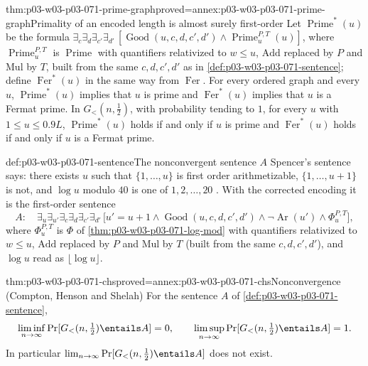 \begin{hbcorollary}{thm:p03-w03-p03-071-prime-graph}{proved=annex:p03-w03-p03-071-prime-graph}{Primality of an encoded length is almost surely first-order}
Let \(\operatorname{Prime}^{\ast}(u)\) be the formula
\(\exists_c\exists_d\exists_{c'}\exists_{d'}\,[\operatorname{Good}(u,c,d,c',d')
\wedge\operatorname{Prime}^{P,T}_u(u)]\), where
\(\operatorname{Prime}^{P,T}_u\) is \(\operatorname{Prime}\) with quantifiers
relativized to \(w\leq u\), \(\mathrm{Add}\) replaced by \(P\) and
\(\mathrm{Mul}\) by \(T\), built from the same \(c,d,c',d'\) as in
\cref{def:p03-w03-p03-071-sentence}; define \(\operatorname{Fer}^{\ast}(u)\)
in the same way from \(\operatorname{Fer}\).  For every ordered graph and
every \(u\), \(\operatorname{Prime}^{\ast}(u)\) implies that \(u\) is prime
and \(\operatorname{Fer}^{\ast}(u)\) implies that \(u\) is a Fermat prime.
In \(G_<(n,\frac12)\), with probability tending to \(1\), for every \(u\)
with \(1\leq u\leq0.9L\), \(\operatorname{Prime}^{\ast}(u)\) holds if and only
if \(u\) is prime and \(\operatorname{Fer}^{\ast}(u)\) holds if and only if
\(u\) is a Fermat prime.
\end{hbcorollary}

\begin{hbdefinition}{def:p03-w03-p03-071-sentence}{The nonconvergent sentence \(A\)}
Spencer's sentence says: there exists \(u\) such that
\(\{1,\ldots,u\}\) is first order arithmetizable, \(\{1,\ldots,u+1\}\) is
not, and \(\log u\) modulo \(40\) is one of \(1,2,\ldots,20\)
\cite[p.~23]{Spencer2007LogicRandomStructuresAuthor}.  With the corrected
encoding it is the first-order sentence
\[
  A:\quad\exists_u\exists_{u'}\exists_c\exists_d\exists_{c'}\exists_{d'}\,
  \bigl[u'=u+1\wedge\operatorname{Good}(u,c,d,c',d')\wedge
  \neg\operatorname{Ar}(u')\wedge\Phi^{P,T}_u\bigr],
\]
where \(\Phi^{P,T}_u\) is \(\Phi\) of \cref{thm:p03-w03-p03-071-log-mod} with
quantifiers relativized to \(w\leq u\), \(\mathrm{Add}\) replaced by \(P\)
and \(\mathrm{Mul}\) by \(T\) (built from the same \(c,d,c',d'\)), and
\(\log u\) read as \(\lfloor\log u\rfloor\).
\end{hbdefinition}

\begin{hbtheorem}{thm:p03-w03-p03-071-chs}{proved=annex:p03-w03-p03-071-chs}{Nonconvergence (Compton, Henson and Shelah)}
For the sentence \(A\) of \cref{def:p03-w03-p03-071-sentence},
\[
  \liminf_{n\to\infty}\Pr[G_<(n,\tfrac12)\entails A]=0,\qquad
  \limsup_{n\to\infty}\Pr[G_<(n,\tfrac12)\entails A]=1 .
\]
In particular \(\lim_{n\to\infty}\Pr[G_<(n,\frac12)\entails A]\) does not
exist.
\end{hbtheorem}

